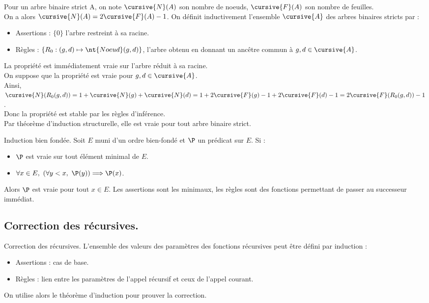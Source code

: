 \documentclass[french, 11pt]{article}
\begin{document}
\begin{ex}{}{}
    Pour un arbre binaire strict A, on note $\cursive{N}(A)$ son nombre de noeuds, $\cursive{F}(A)$ son nombre de feuilles.\\
    On a alors $\cursive{N}(A)=2\cursive{F}(A)-1$.
    \tcblower
    On définit inductivement l'ensemble $\cursive{A}$ des arbres binaires stricts par :
    \begin{itemize}
        \item Assertions : $\{0\}$ l'arbre restreint à sa racine.
        \item Règles : $\{R_0:(g,d) \mapsto \nt{Noeud}(g,d)\}$, l'arbre obtenu en donnant un ancêtre commun à $g,d\in\cursive{A}$.
    \end{itemize}
    La propriété est immédiatement vraie sur l'arbre réduit à sa racine.\\
    On suppose que la propriété est vraie pour $g,d\in\cursive{A}$.\\
    Ainsi, $\cursive{N}(R_0(g,d))=1+\cursive{N}(g)+\cursive{N}(d)=1+2\cursive{F}(g)-1+2\cursive{F}(d)-1=2\cursive{F}(R_0(g,d))-1$.\\
    Donc la propriété est stable par les règles d'inférence.\\
    Par théorème d'induction structurelle, elle est vraie pour tout arbre binaire strict.
\end{ex}

\begin{corr}{Induction bien fondée.}{}
    Soit $E$ muni d'un ordre bien-fondé et $\P$ un prédicat sur $E$. Si :
    \begin{itemize}
        \item $\P$ est vraie sur tout élément minimal de $E$.
        \item $\forall x\in E, ~ (\forall y<x, ~ \P(y)) \Longrightarrow \P(x)$.
    \end{itemize}
    Alors $\P$ est vraie pour tout $x\in E$.
    \tcblower
    Les assertions sont les minimaux, les règles sont des fonctions permettant de passer au successeur immédiat.
\end{corr}

\subsection{Correction des récursives.}

\begin{meth}{Correction des récursives.}{}
    L'ensemble des valeurs des paramètres des fonctions récursives peut être défini par induction :
    \begin{itemize}
        \item Assertions : cas de base.
        \item Règles : lien entre les paramètres de l'appel récursif et ceux de l'appel courant.
    \end{itemize}
    On utilise alors le théorème d'induction pour prouver la correction.
\end{meth}

\fin
\end{document}
